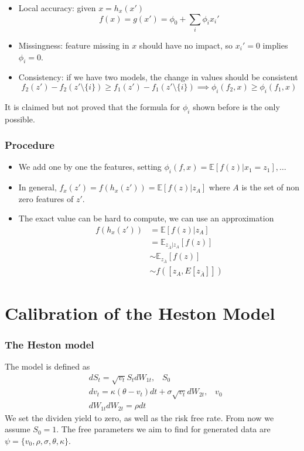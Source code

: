 \documentclass{beamer}
\theoremstyle{plain}
\theoremstyle{definition}
\theoremstyle{remark}
\newcommand{\E}{\mathbb{E}}
\begin{document}
\begin{frame}
	\begin{itemize}
		\item Local accuracy: given $x=h_x(x')$
		\begin{equation}
			f(x) = g(x') = \phi_0 + \sum_{i}{\phi_ix_i'}
		\end{equation}
		\item Missingness: feature missing in $x$ should have no impact, so $x_i'=0$ implies $\phi_i=0$.
		\item Consistency: if we have two models, the change in values should be consistent
		\begin{equation*}
			f_2(z')-f_2(z'\setminus \{i\})\geq f_1(z')-f_1(z'\setminus \{i\}) \implies \phi_i(f_2,x)\geq \phi_i(f_1,x)
		\end{equation*}
	\end{itemize}
	It is claimed but not proved that the formula for $\phi_i$ shown before is the only possible.
\end{frame}

\begin{frame}
	\frametitle{Procedure}
	\begin{itemize}
		\item We add one by one the features, setting $\phi_i(f,x)=\E[f(z)|x_1=z_1], \ldots$
		\item In general, $f_x(z') = f(h_x(z'))=\E[f(z)|z_A]$ where $A$ is the set of non zero features of $z'$.
		\item The exact value can be hard to compute, we can use an approximation
		\begin{equation}
			\begin{split}
			f(h_x(z')) & = \E[f(z)|z_A] \\
			& = \E_{z_{\bar{A}}|z_A}[f(z)]\\
			& \sim \E_{z_{\bar{A}}}[f(z)]\\
			& \sim f([z_A, E[z_{\bar{A}}]])
			\end{split}
		\end{equation}
	\end{itemize}
\end{frame}

\section{Calibration of the Heston Model}

\begin{frame}
	\frametitle{The Heston model}
	The model is defined as
	\begin{equation}
		\begin{split}
		&dS_t = \sqrt{v_t}S_tdW_{1t}, \;\;\; S_0\\
		&dv_t = \kappa(\theta - v_t)dt +\sigma \sqrt{v_t}dW_{2t}, \;\;\; v_0\\
		&dW_{1t}dW_{2t} = \rho dt
		\end{split}
	\end{equation}
	We set the dividen yield to zero, as well as the risk free rate. From now we assume $S_0=1$.\newline
	The free parameters we aim to find for generated data are $\psi = \{v_0, \rho, \sigma, \theta, \kappa\}$.
\end{frame}
\end{document}
